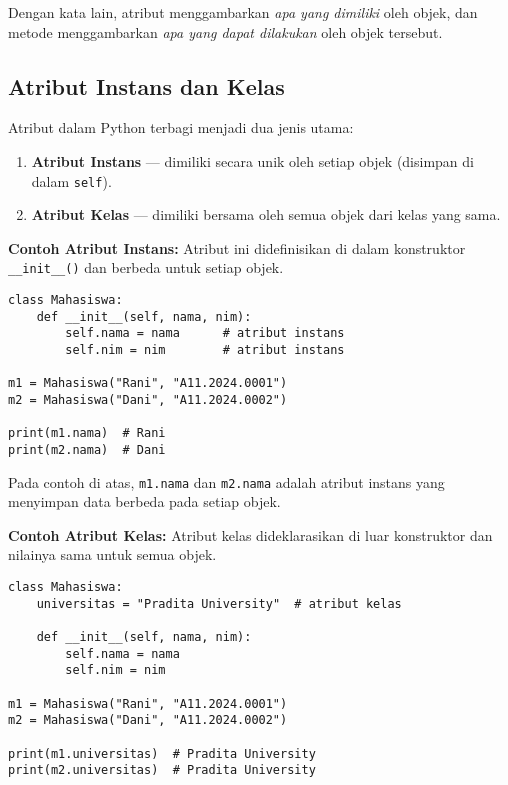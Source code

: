 Dengan kata lain, atribut menggambarkan \emph{apa yang dimiliki} oleh objek, dan metode menggambarkan \emph{apa yang dapat dilakukan} oleh objek tersebut.

\subsection{Atribut Instans dan Kelas}

Atribut dalam Python terbagi menjadi dua jenis utama:
\begin{enumerate}
    \item \textbf{Atribut Instans} — dimiliki secara unik oleh setiap objek (disimpan di dalam \texttt{self}).
    \item \textbf{Atribut Kelas} — dimiliki bersama oleh semua objek dari kelas yang sama.
\end{enumerate}

\noindent\textbf{Contoh Atribut Instans:}
Atribut ini didefinisikan di dalam konstruktor \texttt{__init__()} dan berbeda untuk setiap objek.

\begin{lstlisting}[style=PythonStyle, caption={Atribut Instans}]
class Mahasiswa:
    def __init__(self, nama, nim):
        self.nama = nama      # atribut instans
        self.nim = nim        # atribut instans

m1 = Mahasiswa("Rani", "A11.2024.0001")
m2 = Mahasiswa("Dani", "A11.2024.0002")

print(m1.nama)  # Rani
print(m2.nama)  # Dani
\end{lstlisting}

Pada contoh di atas, \texttt{m1.nama} dan \texttt{m2.nama} adalah atribut instans yang menyimpan data berbeda pada setiap objek.

\noindent\textbf{Contoh Atribut Kelas:}
Atribut kelas dideklarasikan di luar konstruktor dan nilainya sama untuk semua objek.

\begin{lstlisting}[style=PythonStyle, caption={Atribut Kelas}]
class Mahasiswa:
    universitas = "Pradita University"  # atribut kelas

    def __init__(self, nama, nim):
        self.nama = nama
        self.nim = nim

m1 = Mahasiswa("Rani", "A11.2024.0001")
m2 = Mahasiswa("Dani", "A11.2024.0002")

print(m1.universitas)  # Pradita University
print(m2.universitas)  # Pradita University
\end{lstlisting}

